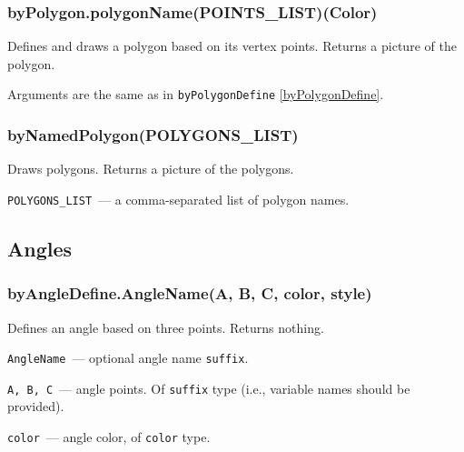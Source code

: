 
\subsubsection{byPolygon.polygonName(POINTS\_LIST)(Color)}\label{byPolygon}

	Defines and draws a polygon based on its vertex points. Returns a picture of the polygon.
	
	Arguments are the same as in \texttt{byPolygonDefine} \ref{byPolygonDefine}.


\subsubsection{byNamedPolygon(POLYGONS\_LIST)}\label{byNamedPolygon}
	
	Draws polygons. Returns a picture of the polygons.
	
	\texttt{POLYGONS\_LIST}~— a comma-separated list of polygon names.


\subsection{Angles}

\subsubsection{byAngleDefine.AngleName(A, B, C, color, style)}\label{byAngleDefine}
	
	
	Defines an angle based on three points. Returns nothing.

	\texttt{AngleName}~— optional angle name \texttt{suffix}.
		
	\texttt{A, B, C}~— angle points. Of \texttt{suffix} type (i.e., variable names should be provided).
	
	\texttt{color}~— angle color, of \texttt{color} type.
	
